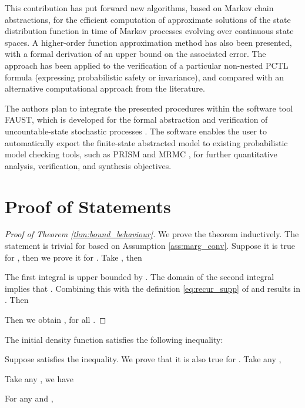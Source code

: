 \documentclass{LMCS}
\begin{document}
This contribution has put forward new algorithms, 
based on Markov chain abstractions, 
for the efficient computation of approximate solutions of the state distribution function in time of Markov processes evolving over continuous state spaces. 
A higher-order function approximation method has also been presented, with a formal derivation of an upper bound on the associated error.  
The approach has been applied to the verification of a particular non-nested PCTL formula (expressing probabilistic safety or invariance), 
and compared with an alternative computational approach from the literature.

The authors plan to integrate the presented procedures within the software tool \textsf{FAUST}, 
which is developed for the formal abstraction and verification of uncountable-state stochastic processes \cite{FAUST15}. 
The software enables the user to automatically export the finite-state abstracted model to existing probabilistic model checking tools,  
such as PRISM and MRMC \cite{HKNP06,KKZ05}, for further quantitative analysis, verification, and synthesis objectives.
  




\vspace{2cm}\appendix
\section{Proof of Statements}
\begin{proof}[Proof of Theorem \ref{thm:bound_behaviour}]
We prove the theorem inductively.
The statement is trivial for  based on Assumption \ref{ass:marg_conv}.
Suppose it is true for , then we prove it for .
Take , then

The first integral is upper bounded by .
The domain of the second integral implies that . Combining this with the definition \eqref{eq:recur_supp} of  and  results in . Then 

Then we obtain , 
for all .
\end{proof}

The initial density function  satisfies the following inequality:

Suppose  satisfies the inequality. We prove that it is also true for .
Take any ,

Take any , we have


For any  and ,
\end{document}
